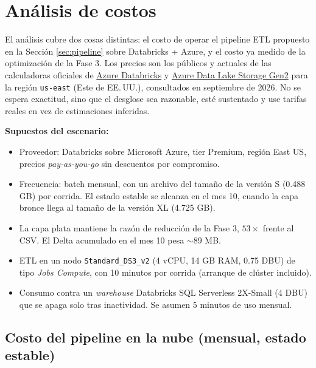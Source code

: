 \section{Análisis de costos}
\label{sec:costos}

El análisis cubre dos cosas distintas: el costo de operar el pipeline ETL propuesto en la Sección \ref{sec:pipeline} sobre Databricks + Azure, y el costo ya medido de la optimización de la Fase 3. Los precios son los públicos y actuales de las calculadoras oficiales de \href{https://azure.microsoft.com/en-us/pricing/details/databricks/}{Azure Databricks} y \href{https://azure.microsoft.com/en-us/pricing/details/storage/data-lake/}{Azure Data Lake Storage Gen2} para la región \texttt{us-east} (Este de EE.\,UU.), consultados en septiembre de 2026. No se espera exactitud, sino que el desglose sea razonable, esté sustentado y use tarifas reales en vez de estimaciones inferidas.

\textbf{Supuestos del escenario:}

\begin{itemize}
  \item Proveedor: Databricks sobre Microsoft Azure, tier Premium, región East US, precios \emph{pay-as-you-go} sin descuentos por compromiso.
  \item Frecuencia: batch mensual, con un archivo del tamaño de la versión S (0.488 GB) por corrida. El estado estable se alcanza en el mes 10, cuando la capa bronce llega al tamaño de la versión XL (4.725 GB).
  \item La capa plata mantiene la razón de reducción de la Fase 3, $53\times$ frente al CSV. El Delta acumulado en el mes 10 pesa $\sim$89 MB.
  \item ETL en un nodo \texttt{Standard\_DS3\_v2} (4 vCPU, 14 GB RAM, 0.75 DBU) de tipo \emph{Jobs Compute}, con 10 minutos por corrida (arranque de clúster incluido).
  \item Consumo contra un \emph{warehouse} Databricks SQL Serverless 2X-Small (4 DBU) que se apaga solo tras inactividad. Se asumen 5 minutos de uso mensual.
\end{itemize}

\subsection{Costo del pipeline en la nube (mensual, estado estable)}

